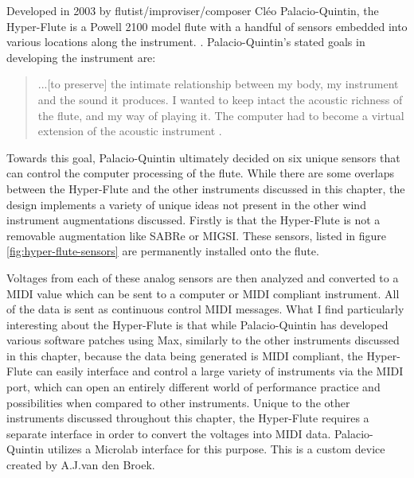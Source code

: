 Developed in 2003 by flutist/improviser/composer Cléo Palacio-Quintin, the Hyper-Flute is a Powell 2100 model flute with a handful of sensors embedded into various locations along the instrument. \cite{hyper-flute2003}. Palacio-Quintin's stated goals in developing the instrument are: 

\begin{quote}
    ...[to preserve] the intimate relationship between my body, my instrument and the sound it produces. I wanted to keep intact the acoustic richness of the flute, and my way of playing it. The computer had to become a virtual extension of the acoustic instrument \cite{hyper-flute2003}.
\end{quote}

Towards this goal, Palacio-Quintin ultimately decided on six unique sensors that can control the computer processing of the flute. While there are some overlaps between the Hyper-Flute and the other instruments discussed in this chapter, the design implements a variety of unique ideas not present in the other wind instrument augmentations discussed. Firstly is that the Hyper-Flute is not a removable augmentation like SABRe or MIGSI. These sensors, listed in figure \ref{fig:hyper-flute-sensors} are permanently installed onto the flute. 


Voltages from each of these analog sensors are then analyzed and converted to a MIDI value which can be sent to a computer or MIDI compliant instrument. All of the data is sent as continuous control MIDI messages. What I find particularly interesting about the Hyper-Flute is that while Palacio-Quintin has developed various software patches using Max, similarly to the other instruments discussed in this chapter, because the data being generated is MIDI compliant, the Hyper-Flute can easily interface and control a large variety of instruments via the MIDI port, which can open an entirely different world of performance practice and possibilities when compared to other instruments\cite{hyper-flute2003}. Unique to the other instruments discussed throughout this chapter, the Hyper-Flute requires a separate interface in order to convert the voltages into MIDI data. Palacio-Quintin utilizes a Microlab interface for this purpose. This is a custom device created by A.J.van den Broek\cite{hyper-flute2003}. 

